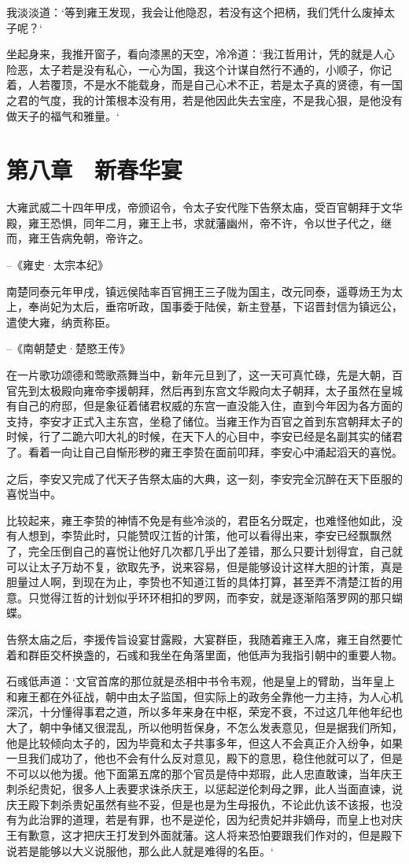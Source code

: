 我淡淡道：‘等到雍王发现，我会让他隐忍，若没有这个把柄，我们凭什么废掉太子呢？‘

坐起身来，我推开窗子，看向漆黑的天空，冷冷道：‘我江哲用计，凭的就是人心险恶，太子若是没有私心，一心为国，我这个计谋自然行不通的，小顺子，你记着，人若覆顶，不是水不能载身，而是自己心术不正，若是太子真的贤德，有一国之君的气度，我的计策根本没有用，若是他因此失去宝座，不是我心狠，是他没有做天子的福气和雅量。‘

\chapter{第八章　新春华宴}

大雍武威二十四年甲戌，帝颁诏令，令太子安代陛下告祭太庙，受百官朝拜于文华殿，雍王恐惧，同年二月，雍王上书，求就藩幽州，帝不许，令以世子代之，继而，雍王告病免朝，帝许之。

--《雍史·太宗本纪》

南楚同泰元年甲戌，镇远侯陆率百官拥王三子陇为国主，改元同泰，遥尊炀王为太上，奉尚妃为太后，垂帘听政，国事委于陆侯，新主登基，下诏晋封信为镇远公，遣使大雍，纳贡称臣。

--《南朝楚史·楚愍王传》

在一片歌功颂德和莺歌燕舞当中，新年元旦到了，这一天可真忙碌，先是大朝，百官先到太极殿向雍帝李援朝拜，然后再到东宫文华殿向太子朝拜，太子虽然在皇城有自己的府邸，但是象征着储君权威的东宫一直没能入住，直到今年因为各方面的支持，李安才正式入主东宫，坐稳了储位。当雍王作为百官之首到东宫朝拜太子的时候，行了二跪六叩大礼的时候，在天下人的心目中，李安已经是名副其实的储君了。看着一向让自己自惭形秽的雍王李贽在面前叩拜，李安心中涌起滔天的喜悦。

之后，李安又完成了代天子告祭太庙的大典，这一刻，李安完全沉醉在天下臣服的喜悦当中。

比较起来，雍王李贽的神情不免是有些冷淡的，君臣名分既定，也难怪他如此，没有人想到，李贽此时，只能赞叹江哲的计策，他可以看得出来，李安已经飘飘然了，完全压倒自己的喜悦让他好几次都几乎出了差错，那么只要计划得宜，自己就可以让太子万劫不复，欲取先予，说来容易，但是能够设计这样大胆的计策，真是胆量过人啊，到现在为止，李贽也不知道江哲的具体打算，甚至弄不清楚江哲的用意。只觉得江哲的计划似乎环环相扣的罗网，而李安，就是逐渐陷落罗网的那只蝴蝶。

告祭太庙之后，李援传旨设宴甘露殿，大宴群臣，我随着雍王入席，雍王自然要忙着和群臣交杯换盏的，石彧和我坐在角落里面，他低声为我指引朝中的重要人物。

石彧低声道：‘文官首席的那位就是丞相中书令韦观，他是皇上的臂助，当年皇上和雍王都在外征战，朝中由太子监国，但实际上的政务全靠他一力主持，为人心机深沉，十分懂得事君之道，所以多年来身在中枢，荣宠不衰，不过这几年他年纪也大了，朝中争储又很混乱，所以他明哲保身，不怎么发表意见，但是据我们所知，他是比较倾向太子的，因为毕竟和太子共事多年，但这人不会真正介入纷争，如果一旦我们成功了，他也不会有什么反对意见，殿下的意思，稳住他就可以了，但是不可以以他为援。他下面第五席的那个官员是侍中郑瑕，此人忠直敢谏，当年庆王刺杀纪贵妃，很多人上表要求诛杀庆王，以惩起逆伦刺母之罪，此人当面直谏，说庆王殿下刺杀贵妃虽然有些不妥，但是也是为生母报仇，不论此仇该不该报，也没有为此治罪的道理，若是有罪，也不是逆伦，因为纪贵妃并非嫡母，而皇上也对庆王有歉意，这才把庆王打发到外面就藩。这人将来恐怕要跟我们作对的，但是殿下说若是能够以大义说服他，那么此人就是难得的名臣。‘

